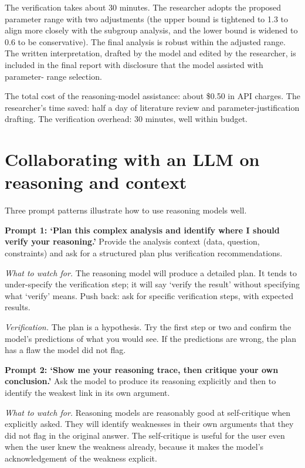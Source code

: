 \documentclass[
  letterpaper,
  11pt]{scrbook}
\begin{document}
The verification takes about 30 minutes. The researcher adopts the
proposed parameter range with two adjustments (the upper bound is
tightened to 1.3 to align more closely with the subgroup analysis, and
the lower bound is widened to 0.6 to be conservative). The final
analysis is robust within the adjusted range. The written
interpretation, drafted by the model and edited by the researcher, is
included in the final report with disclosure that the model assisted
with parameter- range selection.

The total cost of the reasoning-model assistance: about \$0.50 in API
charges. The researcher's time saved: half a day of literature review
and parameter-justification drafting. The verification overhead: 30
minutes, well within budget.

\section{Collaborating with an LLM on reasoning and
context}\label{collaborating-with-an-llm-on-reasoning-and-context}

Three prompt patterns illustrate how to use reasoning models well.

\textbf{Prompt 1: `Plan this complex analysis and identify where I
should verify your reasoning.'} Provide the analysis context (data,
question, constraints) and ask for a structured plan plus verification
recommendations.

\emph{What to watch for.} The reasoning model will produce a detailed
plan. It tends to under-specify the verification step; it will say
`verify the result' without specifying what `verify' means. Push back:
ask for specific verification steps, with expected results.

\emph{Verification.} The plan is a hypothesis. Try the first step or two
and confirm the model's predictions of what you would see. If the
predictions are wrong, the plan has a flaw the model did not flag.

\textbf{Prompt 2: `Show me your reasoning trace, then critique your own
conclusion.'} Ask the model to produce its reasoning explicitly and then
to identify the weakest link in its own argument.

\emph{What to watch for.} Reasoning models are reasonably good at
self-critique when explicitly asked. They will identify weaknesses in
their own arguments that they did not flag in the original answer. The
self-critique is useful for the user even when the user knew the
weakness already, because it makes the model's acknowledgement of the
weakness explicit.
\end{document}

